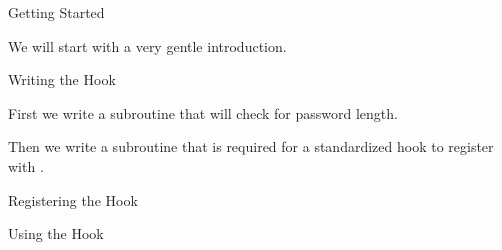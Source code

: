 
\begin{section}{Getting Started}

We will start with a very gentle introduction.

\begin{subsection}{Writing the Hook}

First we write a subroutine that will check for password length.



Then we write a subroutine that is required for a standardized hook to register with \cPanel.



\end{subsection}

\begin{subsection}{Registering the Hook}


\end{subsection}

\begin{subsection}{Using the Hook}


\end{subsection}

\end{section}
